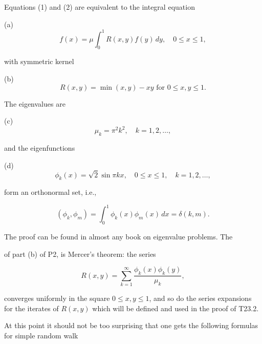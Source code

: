Equations (1) and (2) are equivalent to the integral equation

(a) $$f(x) = \mu \int_0^1 R(x,y)f(y) \, dy, \quad 0 \leq x \leq 1,$$

with symmetric kernel

(b) $$R(x,y) = \min(x,y) - xy \text{ for } 0 \leq x, y \leq 1.$$

The eigenvalues are

(c) $$\mu_k = \pi^2 k^2, \quad k = 1, 2, \ldots,$$

and the eigenfunctions

(d) $$\phi_k(x) = \sqrt{2} \sin \pi kx, \quad 0 \leq x \leq 1, \quad k = 1, 2, \ldots,$$

form an orthonormal set, i.e.,

$$(\phi_k, \phi_m) = \int_0^1 \phi_k(x) \phi_m(x) \, dx = \delta(k,m).$$

The proof can be found in almost any book on eigenvalue problems. The

of part (b) of P2, is Mercer's theorem: the series

$$R(x,y) = \sum_{k=1}^{\infty} \frac{\phi_k(x)\phi_k(y)}{\mu_k},$$

converges uniformly in the square $0 \leq x, y \leq 1$, and so do the series expansions for the iterates of $R(x,y)$ which will be defined and used in the proof of T23.2.

At this point it should not be too surprising that one gets the following formulas for simple random walk